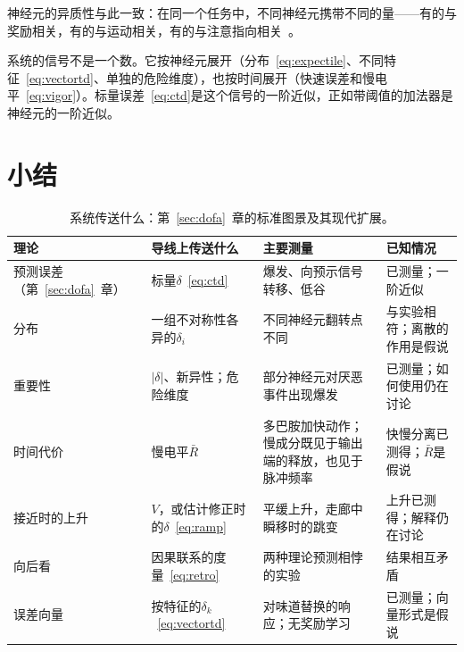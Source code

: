 神经元的异质性与此一致：在同一个任务中，不同神经元携带不同的量——有的与奖励相关，有的与运动相关，有的与注意指向相关~\cite{Engelhard2019}。

\begin{keyblock}
\begin{proposition}[线束代替导线]
\label{prop:bundle}
系统的信号不是一个数。它按神经元展开（分布~\eqref{eq:expectile}、不同特征~\eqref{eq:vectortd}、单独的危险维度），也按时间展开（快速误差和慢电平~\eqref{eq:vigor}）。标量误差~\eqref{eq:ctd}是这个信号的一阶近似，正如带阈值的加法器是神经元的一阶近似。
\end{proposition}
\end{keyblock}

\section{小结}

\begin{table}[t]
\centering
\footnotesize
\setlength{\tabcolsep}{4pt}
\renewcommand{\arraystretch}{1.15}
\begin{tabular}{>{\raggedright}p{2.5cm}>{\raggedright}p{3.2cm}>{\raggedright}p{3.6cm}>{\raggedright\arraybackslash}p{4.2cm}}
\toprule
理论 & 导线上传送什么 & 主要测量 & 已知情况 \\
\midrule
预测误差（第~\ref{sec:dofa}~章） & 标量$\delta$~\eqref{eq:ctd} & 爆发、向预示信号转移、低谷 & 已测量；一阶近似 \\
分布 & 一组不对称性各异的$\delta_i$ & 不同神经元翻转点不同 & 与实验相符；离散的作用是假说 \\
重要性 & $|\delta|$、新异性；危险维度 & 部分神经元对厌恶事件出现爆发 & 已测量；如何使用仍在讨论 \\
时间代价 & 慢电平$\bar R$ & 多巴胺加快动作；慢成分既见于输出端的释放，也见于脉冲频率 & 快慢分离已测得；$\bar R$是假说 \\
接近时的上升 & $V$，或估计修正时的$\delta$~\eqref{eq:ramp} & 平缓上升，走廊中瞬移时的跳变 & 上升已测得；解释仍在讨论 \\
向后看 & 因果联系的度量~\eqref{eq:retro} & 两种理论预测相悖的实验 & 结果相互矛盾 \\
误差向量 & 按特征的$\delta_k$~\eqref{eq:vectortd} & 对味道替换的响应；无奖励学习 & 已测量；向量形式是假说 \\
\bottomrule
\end{tabular}
\caption{系统传送什么：第~\ref{sec:dofa}~章的标准图景及其现代扩展。}
\label{tab:dofaalt}
\end{table}

